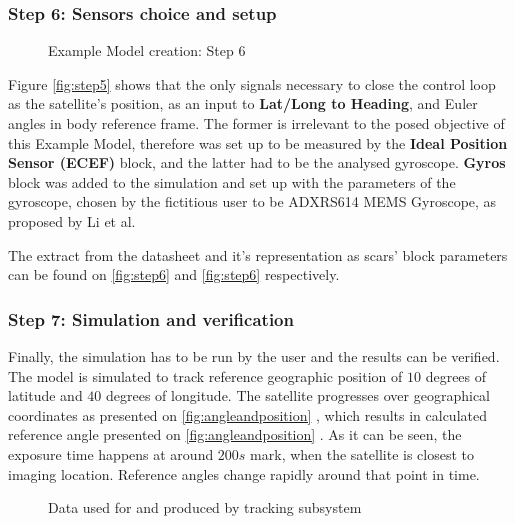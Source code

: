         \subsubsection*{Step 6: Sensors choice and setup}
            \begin{figure}[H]
                \centering
                \quad
                \caption{Example Model creation: Step 6}%
                \label{fig:step6}%
            \end{figure}
            Figure \autoref{fig:step5} shows that the only signals necessary to close the control loop as the satellite's position, as an input to \textbf{Lat/Long to Heading}, and Euler angles in body reference frame. The former is irrelevant to the posed objective of this Example Model, therefore was set up to be measured by the \textbf{Ideal Position Sensor (ECEF)} block, and the latter had to be the analysed gyroscope. \textbf{Gyros} block was added to the simulation and set up with the parameters of the gyroscope, chosen by the fictitious user to be ADXRS614 MEMS Gyroscope, as proposed by Li et al\cite{li2013design}.
            
            The extract from the datasheet and it's representation as \ac{scars}' block parameters can be found on \autoref{fig:step6}  and \autoref{fig:step6}  respectively.

            \vfill
        \subsubsection*{Step 7: Simulation and verification}
            Finally, the simulation has to be run by the user and the results can be verified. The model is simulated to track reference geographic position of $10$ degrees of latitude and $40$ degrees of longitude. The satellite progresses over geographical coordinates as presented on \autoref{fig:angleandposition} , which results in calculated reference angle presented on \autoref{fig:angleandposition} . As it can be seen, the exposure time happens at around $200s$ mark, when the satellite is closest to imaging location. Reference angles change rapidly around that point in time.

            \vfill
            \begin{figure}[H]
                \centering
                \quad
                \caption{Data used for and produced by tracking subsystem}%
                \label{fig:angleandposition}%
            \end{figure}
            \vfill
            \clearpage


